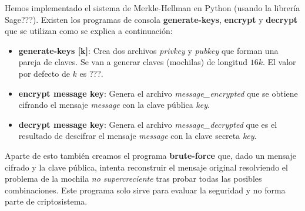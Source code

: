 \documentclass[12pt]{article}
\begin{document}
Hemos implementado el sistema de Merkle-Hellman en Python (usando la librería Sage???). Existen los programas de consola \textbf{generate-keys}, \textbf{encrypt} y \textbf{decrypt} que se utilizan como se explica a continuación:

\begin{itemize}
	\item \textbf{generate-keys [k]}: Crea dos archivos \textit{privkey} y \textit{pubkey} que forman una pareja de claves. Se van a generar claves (mochilas) de longitud $16k$. El valor por defecto de $k$ es ???.
	\item \textbf{encrypt message key}: Genera el archivo \textit{message\_encrypted} que se obtiene cifrando el mensaje \textit{message} con la clave pública \textit{key}.
	\item \textbf{decrypt message key}: Genera el archivo \textit{message\_decrypted} que es el resultado de descifrar el mensaje \textit{message} con la clave secreta \textit{key}.
\end{itemize}
Aparte de esto también creamos el programa \textbf{brute-force} que, dado un mensaje cifrado y la clave pública, intenta reconstruir el mensaje original resolviendo el problema de la mochila \emph{no supercreciente} tras probar todas las posibles combinaciones. Este programa solo sirve para evaluar la seguridad y no forma parte de criptosistema.



 
 
\end{document}
